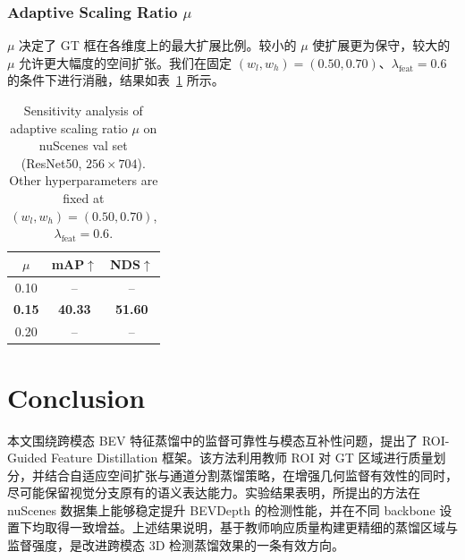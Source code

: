 \documentclass[12pt, UTF8]{ctexart}
\begin{document}
\subsubsection{Adaptive Scaling Ratio $\mu$}
$\mu$ 决定了 GT 框在各维度上的最大扩展比例。较小的 $\mu$ 使扩展更为保守，较大的 $\mu$ 允许更大幅度的空间扩张。我们在固定 $(w_l, w_h) = (0.50, 0.70)$、$\lambda_{\text{feat}} = 0.6$ 的条件下进行消融，结果如表~\ref{tab:mu} 所示。

\begin{table}[H]
\centering
\caption{Sensitivity analysis of adaptive scaling ratio $\mu$ on nuScenes val set (ResNet50, $256\times704$). Other hyperparameters are fixed at $(w_l, w_h) = (0.50, 0.70)$, $\lambda_{\text{feat}} = 0.6$.}
\label{tab:mu}
\small
\vspace{2mm}
\begin{tabular}{c|cc}
\toprule
$\mu$ & mAP$\uparrow$ & NDS$\uparrow$ \\
\midrule
0.10 & -- & -- \\
\textbf{0.15} & \textbf{40.33} & \textbf{51.60} \\
0.20 & -- & -- \\
\bottomrule
\end{tabular}
\end{table}

\section{Conclusion}
本文围绕跨模态 BEV 特征蒸馏中的监督可靠性与模态互补性问题，提出了 ROI-Guided Feature Distillation 框架。该方法利用教师 ROI 对 GT 区域进行质量划分，并结合自适应空间扩张与通道分割蒸馏策略，在增强几何监督有效性的同时，尽可能保留视觉分支原有的语义表达能力。实验结果表明，所提出的方法在 nuScenes 数据集上能够稳定提升 BEVDepth 的检测性能，并在不同 backbone 设置下均取得一致增益。上述结果说明，基于教师响应质量构建更精细的蒸馏区域与监督强度，是改进跨模态 3D 检测蒸馏效果的一条有效方向。

\clearpage


\end{document}
